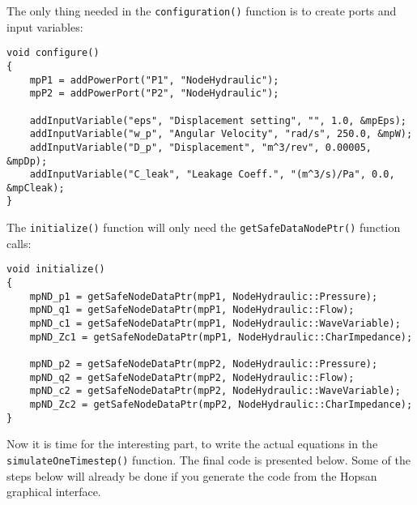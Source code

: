 \documentclass[a4paper,pdftex]{article}
\begin{document}
\noindent The only thing needed in the \texttt{configuration()} function is to create ports and input variables:

\begin{minipage}{\linewidth}
\begin{lstlisting}[basicstyle=\footnotesize\ttfamily]
void configure()
{
    mpP1 = addPowerPort("P1", "NodeHydraulic");
    mpP2 = addPowerPort("P2", "NodeHydraulic");

	addInputVariable("eps", "Displacement setting", "", 1.0, &mpEps);
    addInputVariable("w_p", "Angular Velocity", "rad/s", 250.0, &mpW);
    addInputVariable("D_p", "Displacement", "m^3/rev", 0.00005, &mpDp);
    addInputVariable("C_leak", "Leakage Coeff.", "(m^3/s)/Pa", 0.0, &mpCleak);
}
\end{lstlisting}
\end{minipage}

\noindent The \texttt{initialize()} function will only need the \texttt{getSafeDataNodePtr()} function calls:

\begin{minipage}{\linewidth}
\begin{lstlisting}[basicstyle=\footnotesize\ttfamily]
void initialize()
{
    mpND_p1 = getSafeNodeDataPtr(mpP1, NodeHydraulic::Pressure);
    mpND_q1 = getSafeNodeDataPtr(mpP1, NodeHydraulic::Flow);
    mpND_c1 = getSafeNodeDataPtr(mpP1, NodeHydraulic::WaveVariable);
    mpND_Zc1 = getSafeNodeDataPtr(mpP1, NodeHydraulic::CharImpedance);

    mpND_p2 = getSafeNodeDataPtr(mpP2, NodeHydraulic::Pressure);
    mpND_q2 = getSafeNodeDataPtr(mpP2, NodeHydraulic::Flow);
    mpND_c2 = getSafeNodeDataPtr(mpP2, NodeHydraulic::WaveVariable);
    mpND_Zc2 = getSafeNodeDataPtr(mpP2, NodeHydraulic::CharImpedance);
}
\end{lstlisting}
\end{minipage}

\noindent Now it is time for the interesting part, to write the actual equations in the \texttt{simulateOneTimestep()} function. The final code is presented below. Some of the steps below will already be done if you generate the code from the Hopsan graphical interface.
\end{document}
